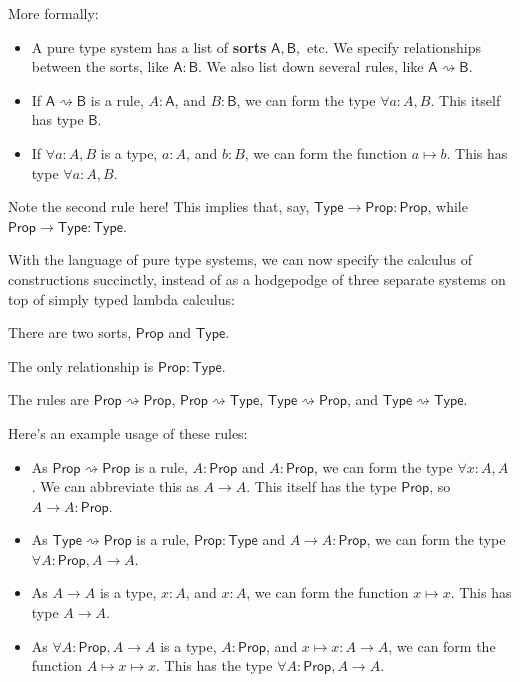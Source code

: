 \documentclass[11pt,paper=letter]{scrartcl}
\renewcommand{\sf}{\mathsf}
\newcommand{\prop}{\mathsf{Prop}}
\newcommand{\type}{\mathsf{Type}}
\newcommand{\toto}{\rightsquigarrow}
\begin{document}
More formally:
\begin{itemize}
\item A pure type system has a list of \textbf{sorts} $\sf{A}, \sf{B},$ etc. We specify relationships between the sorts, like $\sf{A} : \sf{B}$. We also list down several rules, like $\sf{A} \toto \sf{B}$.
\item If $\sf{A} \toto \sf{B}$ is a rule, $A : \sf{A}$, and $B: \sf{B}$, we can form the type $\forall a: A, B$. This itself has type $\sf{B}$.
\item If $\forall a: A, B$ is a type, $a : A$, and $b : B$, we can form the function $a \mapsto b$. This has type $\forall a: A, B$.
\end{itemize}

Note the second rule here! This implies that, say, $\type \to \prop : \prop$, while $\prop \to \type : \type$.

With the language of pure type systems, we can now specify the calculus of constructions succinctly, instead of as a hodgepodge of three separate systems on top of simply typed lambda calculus:
\begin{itemthin}
\item There are two sorts, $\prop$ and $\type$.
\item The only relationship is $\prop : \type$.
\item The rules are $\prop \toto \prop$, $\prop \toto \type$, $\type \toto \prop$, and $\type \toto \type$.
\end{itemthin}
Here's an example usage of these rules:
\begin{itemize}
\item As $\prop \toto \prop$ is a rule, $A: \prop$ and $A: \prop$, we can form the type $\forall x: A, A$. We can abbreviate this as $A \to A$. This itself has the type $\prop$, so $A \to A: \prop$.
\item As $\type \toto \prop$ is a rule, $\prop: \type$ and $A \to A: \prop$, we can form the type $\forall A: \prop, A \to A$.
\item As $A \to A$ is a type, $x: A$, and $x: A$, we can form the function $x \mapsto x$. This has type $A \to A$.
\item As $\forall A: \prop, A \to A$ is a type, $A: \prop$, and $x \mapsto x: A \to A$, we can form the function $A \mapsto x \mapsto x$. This has the type $\forall A: \prop, A \to A$.
\end{itemize}
\end{document}
